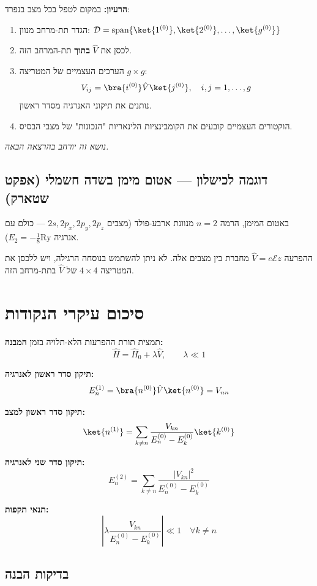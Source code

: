 \textbf{הרעיון:} במקום לטפל בכל מצב בנפרד:
\begin{enumerate}
\item הגדר תת-מרחב מנוון: $\mathcal{D} = \text{span}\{\ket{1^{(0)}}, \ket{2^{(0)}}, \ldots, \ket{g^{(0)}}\}$
\item לכסן את $\hat{V}$ \textbf{בתוך} תת-המרחב הזה.
\item הערכים העצמיים של המטריצה $g \times g$:
\[
V_{ij} = \bra{i^{(0)}}\hat{V}\ket{j^{(0)}}, \quad i,j = 1,\ldots,g
\]
נותנים את תיקוני האנרגיה מסדר ראשון.
\item הוקטורים העצמיים קובעים את הקומבינציות הלינאריות "הנכונות" של מצבי הבסיס.
\end{enumerate}

\textit{נושא זה יורחב בהרצאה הבאה.}

\subsection{דוגמה לכישלון — אטום מימן בשדה חשמלי (אפקט שטארק)}

באטום המימן, הרמה $n=2$ מנוונת ארבע-פולד (מצבים $2s, 2p_x, 2p_y, 2p_z$ — כולם עם אנרגיה $E_2 = -\frac{1}{8}\text{Ry}$).

ההפרעה $\hat{V} = e\mathcal{E}z$ מחברת בין מצבים אלה. לא ניתן להשתמש בנוסחה הרגילה, ויש ללכסן את המטריצה $4 \times 4$ של $\hat{V}$ בתת-מרחב הזה.


\section{סיכום עיקרי הנקודות}

\begin{resultbox}{תמצית תורת ההפרעות הלא-תלויה בזמן}
\textbf{המבנה:}
\[
\hat{H} = \hat{H}_0 + \lambda\hat{V}, \qquad \lambda \ll 1
\]

\textbf{תיקון סדר ראשון לאנרגיה:}
\[
E_n^{(1)} = \bra{n^{(0)}}\hat{V}\ket{n^{(0)}} = V_{nn}
\]

\textbf{תיקון סדר ראשון למצב:}
\[
\ket{n^{(1)}} = \sum_{k\neq n}\frac{V_{kn}}{E_n^{(0)}-E_k^{(0)}}\ket{k^{(0)}}
\]

\textbf{תיקון סדר שני לאנרגיה:}
\[
E_n^{(2)} = \sum_{k\neq n}\frac{|V_{kn}|^2}{E_n^{(0)}-E_k^{(0)}}
\]

\textbf{תנאי תקפות:}
\[
\left|\lambda\frac{V_{kn}}{E_n^{(0)}-E_k^{(0)}}\right| \ll 1 \quad \forall k \neq n
\]
\end{resultbox}

\subsection*{בדיקות הבנה}

